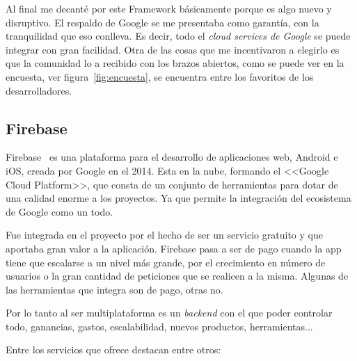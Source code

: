Al final me decanté por este Framework básicamente porque es algo nuevo y disruptivo. El respaldo de Google se me presentaba como garantía, con la tranquilidad que eso conlleva. Es decir, todo el \emph{cloud services de Google} se puede integrar con gran facilidad.
Otra de las cosas que me incentivaron a elegirlo es que la comunidad lo a recibido con los brazos abiertos, como se puede ver en la encuesta, ver figura~\ref{fig:encuesta}, se encuentra entre los favoritos de los desarrolladores.

\subsection{Firebase}
Firebase~\cite{wiki:firebase} es una plataforma para el desarrollo de aplicaciones web, Android e iOS, creada por Google en el 2014. Esta en la nube, formando el <<Google Cloud Platform>>, que consta de un conjunto de herramientas para dotar de una calidad enorme a los proyectos. Ya que permite la integración del ecosistema de Google como un todo.

Fue integrada en el proyecto por el hecho de ser un servicio gratuito y que aportaba gran valor a la aplicación. Firebase pasa a ser de pago cuando la app tiene que escalarse a un nivel más grande, por el crecimiento en número de usuarios o la gran cantidad de peticiones que se realicen a la misma. Algunas de las herramientas que integra son de pago, otras no.

Por lo tanto al ser multiplataforma es un \emph{backend} con el que poder controlar todo, ganancias, gastos, escalabilidad, nuevos productos, herramientas... 

Entre los servicios que ofrece destacan entre otros:

